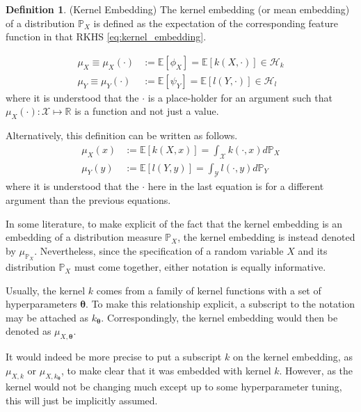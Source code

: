 \documentclass[twoside]{article} \usepackage{aistats2017}
\theoremstyle{definition}
\newtheorem{definition}[theorem]{Definition}
\newcommand{\rv}[1]{{#1}}
\newcommand{\expect}[1]{{\mathbb{E}[#1]}}
\newcommand{\Hk}{\mathcal{H}_{k}}
\newcommand{\Hl}{\mathcal{H}_{l}}
\newcommand{\muX}{\mu_{\rv{X}}}
\newcommand{\muY}{\mu_{\rv{Y}}}
\newcommand{\phiX}{\phi_{\rv{X}}}
\newcommand{\psiY}{\psi_{\rv{Y}}}
\begin{document}
		\begin{definition} \label{def:kernel_embedding}
			(Kernel Embedding)
			The kernel embedding (or mean embedding) of a distribution $\mathbb{P}_{\rv{X}}$ is defined as the expectation of the corresponding feature function in that RKHS \eqref{eq:kernel_embedding}.
			
			\begin{equation}
			\begin{aligned}
				\muX \equiv \muX(\cdot) &:= \expect{\phiX} = \expect{k(\rv{X}, \cdot)} \in \Hk \\
				\muY \equiv \muY(\cdot) &:= \expect{\psiY} = \expect{l(\rv{Y}, \cdot)} \in \Hl
			\label{eq:kernel_embedding}
			\end{aligned}
			\end{equation}	
			where it is understood that the $\cdot$ is a place-holder for an argument such that $\muX(\cdot) : \mathcal{X} \mapsto \mathbb{R}$ is a function and not just a value.

			Alternatively, this definition can be written as follows.
			\begin{equation}
			\begin{aligned}
				\muX(x) &:= \expect{k(\rv{X}, x)} = \int_{\mathcal{X}} k(\cdot, x) d \mathbb{P}_{\rv{X}} \\
				\muY(y) &:= \expect{l(\rv{Y}, y)} = \int_{\mathcal{Y}} l(\cdot, y) d \mathbb{P}_{\rv{Y}}
			\label{eq:kernel_embedding_alternative}
			\end{aligned}
			\end{equation}
			where it is understood that the $\cdot$ here in the last equation is for a different argument than the previous equations.

			In some literature, to make explicit of the fact that the kernel embedding is an embedding of a distribution measure $\mathbb{P}_{\rv{X}}$, the kernel embedding is instead denoted by $\mu_{\mathbb{P}_{\rv{X}}}$. Nevertheless, since the specification of a random variable $\rv{X}$ and its distribution $\mathbb{P}_{\rv{X}}$ must come together, either notation is equally informative.

			Usually, the kernel $k$ comes from a family of kernel functions with a set of hyperparameters $\bm{\theta}$. To make this relationship explicit, a subscript to the notation may be attached as $k_{\bm{\theta}}$. Correspondingly, the kernel embedding would then be denoted as $\mu_{\rv{X}, \bm{\theta}}$.

			It would indeed be more precise to put a subscript $k$ on the kernel embedding, as $\mu_{\rv{X}, k}$ or $\mu_{\rv{X}, k_{\bm{\theta}}}$, to make clear that it was embedded with kernel $k$. However, as the kernel would not be changing much except up to some hyperparameter tuning, this will just be implicitly assumed.
		\end{definition}
	
\end{document}
